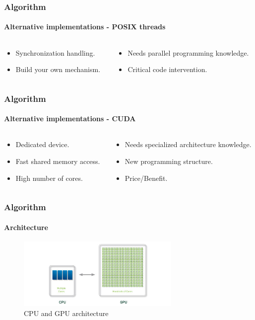 \frame
{
    \frametitle{Algorithm}
    \framesubtitle{Alternative implementations - POSIX threads}
    \begin{columns}
        \begin{column}{0.5\textwidth}
            \begin{itemize}
                \item Synchronization handling.
                \item Build your own mechanism.
            \end{itemize}
        \end{column}
        \begin{column}{0.5\textwidth}
            \begin{itemize}
                \item Needs parallel programming knowledge.
                \item Critical code intervention.
            \end{itemize}
        \end{column}
    \end{columns}
}
\frame
{
    \frametitle{Algorithm}
    \framesubtitle{Alternative implementations - CUDA}
    \begin{columns}
        \begin{column}{0.5\textwidth}
            \begin{itemize}
                \item Dedicated device.
                \item Fast shared memory access.
                \item High number of cores.
            \end{itemize} 
        \end{column}
        \begin{column}{0.5\textwidth}
            \begin{itemize}
                \item Needs specialized architecture knowledge.
                \item New programming structure.
                \item Price/Benefit.
            \end{itemize}
        \end{column}
    \end{columns}
}

\frame
{
    \frametitle{Algorithm}
    \framesubtitle{Architecture}
    \begin{figure}
        \centering
        \includegraphics[width=0.7\textwidth]{img/architecture}
        \caption{CPU and GPU architecture}
    \end{figure}
}
